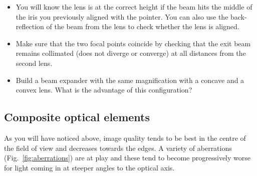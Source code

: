 \documentclass[a4paper]{report}
\begin{document}
\begin{itemize}
\item You will know the lens is at the correct height if the beam hits the middle of the iris you previously aligned with the pointer. 
You can also use the back-reflection of the beam from the lens to check whether the lens is aligned. 
\item Make sure that the two focal points coincide by checking that the exit beam remains collimated (does not diverge or converge) at all distances from the second lens. 
\item Build a beam expander with the same magnification with a concave and a convex lens. What is the advantage of this configuration?
\end{itemize}

%

\clearpage



\subsection{Composite optical elements}
As you will have noticed above, image quality tends to be best in the centre of the field of view and decreases towards the edges. 
A variety of aberrations (Fig.~\ref{fig:aberrations}) are at play and these tend to become progressively worse for light coming in at steeper angles to the optical axis.
\end{document}
